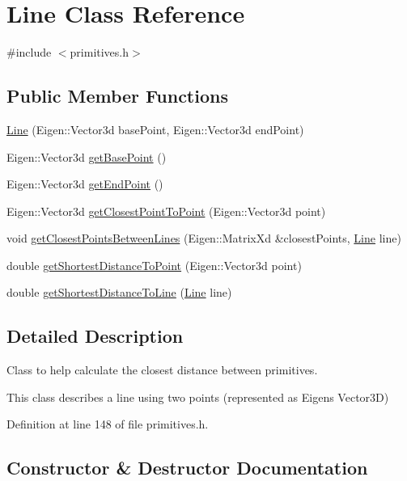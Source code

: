 \hypertarget{class_line}{}\section{Line Class Reference}
\label{class_line}


{\ttfamily \#include $<$primitives.\+h$>$}

\subsection*{Public Member Functions}
\begin{DoxyCompactItemize}
\item 
\hyperlink{class_line_acb2738366446296860a14644c11a93cd}{Line} (Eigen\+::\+Vector3d base\+Point, Eigen\+::\+Vector3d end\+Point)
\item 
Eigen\+::\+Vector3d \hyperlink{class_line_a649b65b3ddb9702ad3800a76ad8ca274}{get\+Base\+Point} ()
\item 
Eigen\+::\+Vector3d \hyperlink{class_line_a227b3d61216a37b32b856a56be6761a7}{get\+End\+Point} ()
\item 
Eigen\+::\+Vector3d \hyperlink{class_line_a920e0d93c96f3fcf85acb301d920063e}{get\+Closest\+Point\+To\+Point} (Eigen\+::\+Vector3d point)
\item 
void \hyperlink{class_line_a61228b3629e0f8b204c60a6d337bb546}{get\+Closest\+Points\+Between\+Lines} (Eigen\+::\+Matrix\+Xd \&closest\+Points, \hyperlink{class_line}{Line} line)
\item 
double \hyperlink{class_line_af874e592b4b8a7db37b0a6d8feb5cf3f}{get\+Shortest\+Distance\+To\+Point} (Eigen\+::\+Vector3d point)
\item 
double \hyperlink{class_line_a4097eed5d653a46fe18b760c67a53a37}{get\+Shortest\+Distance\+To\+Line} (\hyperlink{class_line}{Line} line)
\end{DoxyCompactItemize}


\subsection{Detailed Description}
Class to help calculate the closest distance between primitives.

This class describes a line using two points (represented as Eigen\textquotesingle{}s Vector3D) 

Definition at line 148 of file primitives.\+h.



\subsection{Constructor \& Destructor Documentation}
